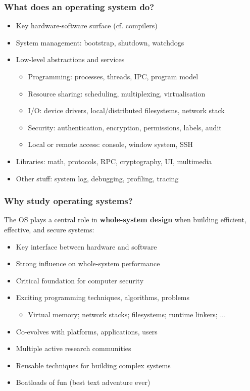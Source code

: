 \documentclass[pdftex]{beamer}
\begin{document}
\begin{frame}
  \frametitle{What does an operating system do?}

  \begin{itemize}
    \item Key hardware-software surface (cf. compilers)
    \item System management: bootstrap, shutdown, watchdogs
    \item Low-level abstractions and services
    \begin{itemize}
      \item Programming: processes, threads, IPC, program model
      \item Resource sharing: scheduling, multiplexing, virtualisation
      \item I/O: device drivers, local/distributed filesystems, network stack
      \item Security: authentication, encryption, permissions, labels, audit
      \item Local or remote access: console, window system, SSH
    \end{itemize}
    \item Libraries: math, protocols, RPC, cryptography, UI, multimedia
    \item Other stuff: system log, debugging, profiling, tracing
  \end{itemize}

\end{frame}

\begin{frame}
  \frametitle{Why study operating systems?}

  \bigskip

  The OS plays a central role in \textbf{whole-system design}  when building
  efficient, effective, and secure systems:

  \bigskip

  \begin{itemize}
    \item Key interface between hardware and software
    \item Strong influence on whole-system performance
    \item Critical foundation for computer security
    \item Exciting programming techniques, algorithms, problems
    \begin{itemize}
      \item Virtual memory; network stacks; filesystems; runtime linkers; ...
    \end{itemize}
    \item Co-evolves with platforms, applications, users
    \item Multiple active research communities
    \item Reusable techniques for building complex systems
    \item Boatloads of fun (best text adventure ever)
  \end{itemize}
\end{frame}
\end{document}
